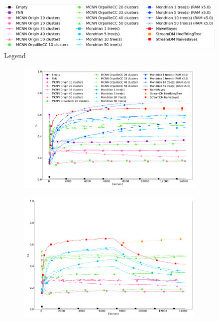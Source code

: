 \begin{figure}[b]
	\includegraphics[width=\linewidth]{figures/legend.png}
	\caption{Legend}
	\label{fig:f1-legend}
\end{figure}
\begin{figure}
	\begin{subfigure}[t]{.49\linewidth}
		\includegraphics[width=\linewidth]{figures/results/banos_6_f1.png}
		\caption{\banosdataset}
		\label{fig:f1-banos}
	\end{subfigure}
	\begin{subfigure}[t]{.49\linewidth}
		\includegraphics[width=\linewidth]{figures/results/drift_6_f1.png}

\end{subfigure}
\end{figure}
